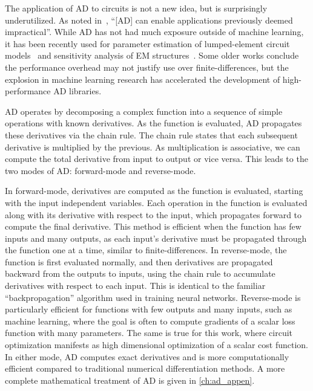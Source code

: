 The application of AD to circuits is not a new idea, but is surprisingly underutilized.
As noted in~\cite{feldmannAutomaticDifferentiationCircuit1992}, ``[AD] can enable applications previously deemed impractical''.
While AD has not had much exposure outside of machine learning, it has been recently used for parameter estimation of lumped-element circuit models~\cite{mezzaDataDrivenParameterEstimation2023a} and sensitivity analysis of EM structures~\cite{toivanenElectromagneticSensitivityAnalysis2009}.
Some older works conclude the performance overhead may not justify use over finite-differences, but the explosion in machine learning research has accelerated the development of high-performance AD libraries.

AD operates by decomposing a complex function into a sequence of simple operations with known derivatives.
As the function is evaluated, AD propagates these derivatives via the chain rule.
The chain rule states that each subsequent derivative is multiplied by the previous.
As multiplication is associative, we can compute the total derivative from input to output or vice versa.
This leads to the two modes of AD: forward-mode and reverse-mode.

In forward-mode, derivatives are computed as the function is evaluated, starting with the input independent variables.
Each operation in the function is evaluated along with its derivative with respect to the input, which propagates forward to compute the final derivative.
This method is efficient when the function has few inputs and many outputs, as each input's derivative must be propagated through the function one at a time, similar to finite-differences.
In reverse-mode, the function is first evaluated normally, and then derivatives are propagated backward from the outputs to inputs, using the chain rule to accumulate derivatives with respect to each input.
This is identical to the familiar ``backpropagation'' algorithm used in training neural networks.
Reverse-mode is particularly efficient for functions with few outputs and many inputs, such as machine learning, where the goal is often to compute gradients of a scalar loss function with many parameters.
The same is true for this work, where circuit optimization manifests as high dimensional optimization of a scalar cost function.
In either mode, AD computes exact derivatives and is more computationally efficient compared to traditional numerical differentiation methods.
A more complete mathematical treatment of AD is given in \autoref{ch:ad_appen}.

